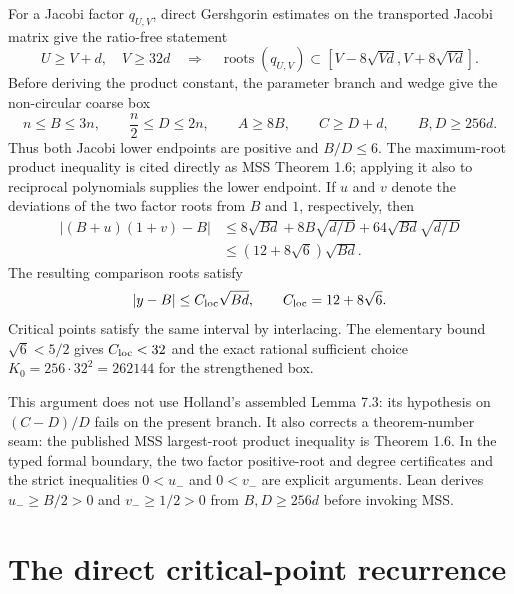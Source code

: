 \documentclass[11pt]{article}
\theoremstyle{definition}
\theoremstyle{remark}
\begin{document}
For a Jacobi factor $q_{U,V}$, direct Gershgorin estimates on the transported
Jacobi matrix give the ratio-free statement
\[
 U\ge V+d,\quad V\ge32d
 \quad\Longrightarrow\quad
 \operatorname{roots}(q_{U,V})\subset
 [V-8\sqrt{Vd},V+8\sqrt{Vd}].
\]
Before deriving the product constant, the parameter branch and wedge give
the non-circular coarse box
\[
 n\le B\le3n,\qquad \frac n2\le D\le2n,
 \qquad A\ge8B,\qquad C\ge D+d,
 \qquad B,D\ge256d.
\]
Thus both Jacobi lower endpoints are positive and $B/D\le6$.  The
maximum-root product inequality is cited directly as MSS Theorem 1.6;
applying it also to reciprocal polynomials supplies the lower endpoint.  If
$u$ and $v$ denote the deviations of the two factor roots from $B$ and $1$,
respectively, then
\begin{align*}
 |(B+u)(1+v)-B|
 &\le8\sqrt{Bd}+8B\sqrt{d/D}
       +64\sqrt{Bd}\sqrt{d/D}\\
 &\le(12+8\sqrt6)\sqrt{Bd}.
\end{align*}
The resulting comparison roots satisfy
\begin{equation}\label{eq:local}
                    |y-B|\le C_{\rm loc}\sqrt{Bd},\qquad
 C_{\rm loc}=12+8\sqrt6.
\end{equation}
Critical points satisfy the same interval by interlacing.  The elementary
bound $\sqrt6<5/2$ gives $C_{\rm loc}<32$ and the exact rational sufficient
choice $K_0=256\cdot32^2=262144$ for the strengthened box.

This argument does not use Holland's assembled Lemma 7.3: its hypothesis on
$(C-D)/D$ fails on the present branch.  It also corrects a theorem-number
seam: the published MSS largest-root product inequality is Theorem 1.6.
In the typed formal boundary, the two factor positive-root and degree
certificates and the strict inequalities $0<u_-$ and $0<v_-$ are explicit
arguments.  Lean derives $u_-\ge B/2>0$ and $v_-\ge1/2>0$ from
$B,D\ge256d$ before invoking MSS.

\section{The direct critical-point recurrence}\label{sec:recurrence}
\end{document}
